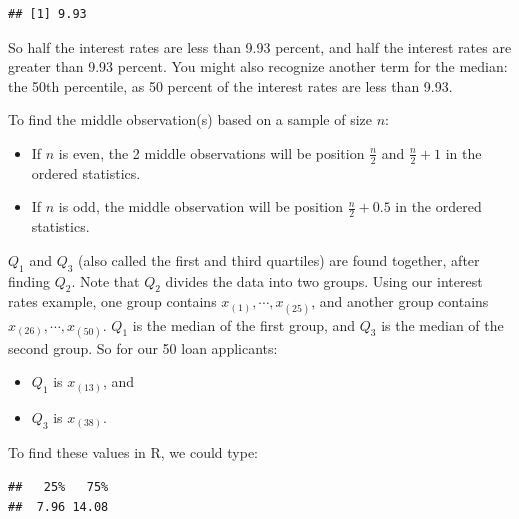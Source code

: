 \documentclass[
]{book}
\newenvironment{Shaded}{\begin{snugshade}}{\end{snugshade}}
\newcommand{\AttributeTok}[1]{\textcolor[rgb]{0.13,0.29,0.53}{#1}}
\newcommand{\DecValTok}[1]{\textcolor[rgb]{0.00,0.00,0.81}{#1}}
\newcommand{\FloatTok}[1]{\textcolor[rgb]{0.00,0.00,0.81}{#1}}
\newcommand{\FunctionTok}[1]{\textcolor[rgb]{0.13,0.29,0.53}{\textbf{#1}}}
\newcommand{\NormalTok}[1]{#1}
\newcommand{\SpecialCharTok}[1]{\textcolor[rgb]{0.81,0.36,0.00}{\textbf{#1}}}
\providecommand{\tightlist}{%
  \setlength{\itemsep}{0pt}\setlength{\parskip}{0pt}}
\begin{document}
\begin{verbatim}
## [1] 9.93
\end{verbatim}

So half the interest rates are less than 9.93 percent, and half the interest rates are greater than 9.93 percent. You might also recognize another term for the median: the 50th percentile, as 50 percent of the interest rates are less than 9.93.

To find the middle observation(s) based on a sample of size \(n\):

\begin{itemize}
\tightlist
\item
  If \(n\) is even, the 2 middle observations will be position \(\frac{n}{2}\) and \(\frac{n}{2} + 1\) in the ordered statistics.
\item
  If \(n\) is odd, the middle observation will be position \(\frac{n}{2} + 0.5\) in the ordered statistics.
\end{itemize}

\(Q_1\) and \(Q_3\) (also called the first and third quartiles) are found together, after finding \(Q_2\). Note that \(Q_2\) divides the data into two groups. Using our interest rates example, one group contains \(x_{(1)}, \cdots, x_{(25)}\), and another group contains \(x_{(26)}, \cdots, x_{(50)}\). \(Q_1\) is the median of the first group, and \(Q_3\) is the median of the second group. So for our 50 loan applicants:

\begin{itemize}
\tightlist
\item
  \(Q_1\) is \(x_{(13)}\), and
\item
  \(Q_3\) is \(x_{(38)}\).
\end{itemize}

To find these values in R, we could type:

\begin{Shaded}
\end{Shaded}

\begin{verbatim}
##   25%   75% 
##  7.96 14.08
\end{verbatim}
\end{document}
